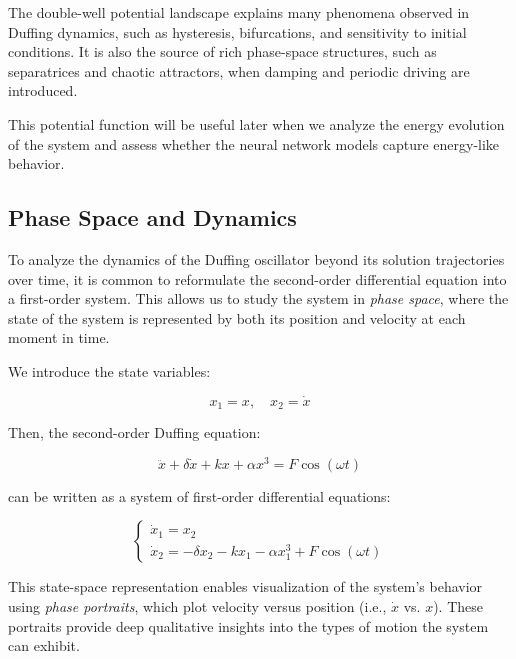 \documentclass{article}
\begin{document}
The double-well potential landscape explains many phenomena observed in Duffing dynamics, such as hysteresis, bifurcations, and sensitivity to initial conditions. It is also the source of rich phase-space structures, such as separatrices and chaotic attractors, when damping and periodic driving are introduced.

This potential function will be useful later when we analyze the energy evolution of the system and assess whether the neural network models capture energy-like behavior.



\subsection{Phase Space and Dynamics}

To analyze the dynamics of the Duffing oscillator beyond its solution trajectories over time, it is common to reformulate the second-order differential equation into a first-order system. This allows us to study the system in \textit{phase space}, where the state of the system is represented by both its position and velocity at each moment in time.

We introduce the state variables:

\begin{equation}
    x_1 = x, \quad x_2 = \dot{x}
\end{equation}

Then, the second-order Duffing equation:

\begin{equation}
    \ddot{x} + \delta \dot{x} + kx + \alpha x^3 = F \cos(\omega t)
\end{equation}

can be written as a system of first-order differential equations:

\begin{equation}
\begin{cases}
    \dot{x}_1 = x_2 \\
    \dot{x}_2 = -\delta x_2 - kx_1 - \alpha x_1^3 + F \cos(\omega t)
\end{cases}
\end{equation}

This state-space representation enables visualization of the system's behavior using \textit{phase portraits}, which plot velocity versus position (i.e., $\dot{x}$ vs. $x$). These portraits provide deep qualitative insights into the types of motion the system can exhibit.
\end{document}
